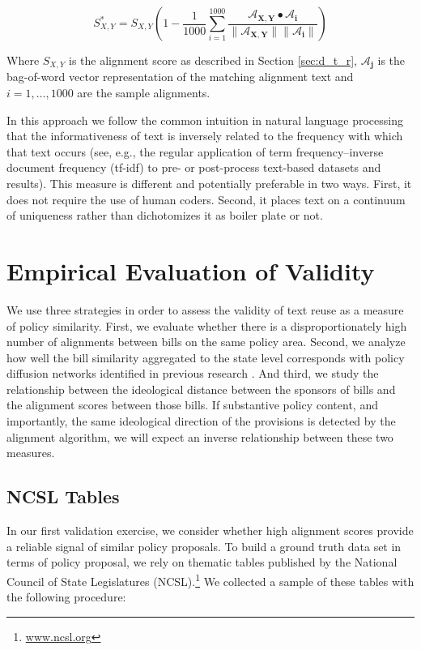 \documentclass[12pt]{article} %
\begin{document}
\begin{equation}
    S^*_{X,Y} = S_{X,Y} \left(1 -
    \frac{1}{1000}\sum_{i=1}^{1000}\frac{\mathbf{\mathcal{A}_{X,Y}} \bullet
    {\mathbf{\mathcal{A}_i}}}{\lVert\mathbf{\mathcal{A}_{X,Y}\rVert\lVert\mathbf{\mathcal{A}_i}}\rVert}\right)
\end{equation}

Where $S_{X,Y}$ is the alignment score as described in Section \ref{sec:d_t_r},
$\mathbf{\mathcal{A}_j}$ is the bag-of-word vector representation of the
matching alignment text and $i = 1,\dots,1000$ are the sample alignments.

In this approach we follow the common intuition in natural language processing that the informativeness of text is inversely related to the frequency with which that text occurs \citep{robertson2004understanding} (see, e.g., the regular application of term frequency--inverse document frequency (tf-idf) to pre- or post-process text-based datasets and results). This measure is different and potentially preferable in two ways. First, it does not require the use of human coders. Second, it places text on a continuum of uniqueness rather than dichotomizes it as boiler plate or not.


\section{Empirical Evaluation of Validity}

We use three strategies in order to assess the validity of text reuse as a measure of policy similarity. First, we evaluate whether there is a disproportionately high number of alignments between bills on the same policy area. Second, we analyze how well the bill similarity aggregated to the state level corresponds with policy diffusion networks identified in previous research \citep{desmarais2015}. And third, we study the relationship between the ideological distance between the sponsors of bills and the alignment scores between those bills. If substantive policy content, and importantly, the same ideological direction of the provisions is detected by the alignment algorithm, we will expect an inverse relationship between these two measures.


\subsection{NCSL Tables}

In our first validation exercise, we consider whether high alignment scores provide a reliable signal of similar policy proposals. To build a ground truth data set in terms of policy proposal, we rely on thematic tables published by the National Council of State Legislatures (NCSL).\footnote{\url{www.ncsl.org}}  We collected a sample of these tables with the following procedure:
\end{document}
